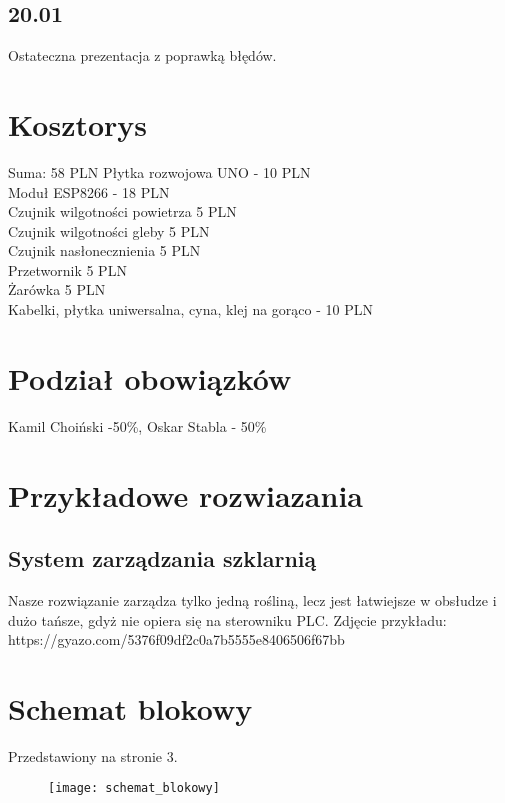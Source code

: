 \documentclass{article}
\begin{document}
\subsection{20.01}
Ostateczna prezentacja z poprawką błędów.
\section{Kosztorys}
Suma: 58 PLN
\newline
Płytka rozwojowa UNO - 10 PLN  \\
Moduł ESP8266 - 18 PLN \\
Czujnik wilgotności powietrza 5 PLN  \\
Czujnik wilgotności gleby 5 PLN  \\
Czujnik nasłonecznienia 5 PLN  \\
Przetwornik 5 PLN  \\
Żarówka 5  PLN  \\
Kabelki, płytka uniwersalna, cyna, klej na gorąco - 10 PLN  \\


\section{Podział obowiązków}
Kamil Choiński -50\%,  Oskar Stabla - 50\%


\section{Przykładowe rozwiazania}
\subsection{System zarządzania szklarnią}
Nasze rozwiązanie zarządza tylko jedną rośliną, lecz jest łatwiejsze w obsłudze i dużo tańsze, gdyż nie opiera się na sterowniku PLC.
Zdjęcie przykładu: https://gyazo.com/5376f09df2c0a7b5555e8406506f67bb

\section{Schemat blokowy}
Przedstawiony na stronie 3.
\begin{figure}
\centering
\texttt{[image: schemat\_blokowy]}
\end{figure}
\end{document}
